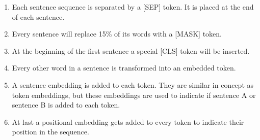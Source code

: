 \begin{enumerate}
    \item Each sentence sequence is separated by a [SEP] token. It is placed at the end of each sentence.
    \item Every sentence will replace 15\% of its words with a [MASK] token.
    \item At the beginning of the first sentence a special [CLS] token will be inserted.
    \item Every other word in a sentence is transformed into an embedded token.
    \item A sentence embedding is added to each token. They are similar in concept as token embeddings, but these embeddings are used to indicate if sentence A or sentence B is added to each token.
    \item At last a positional embedding gets added to every token to indicate their position in the sequence.
\end{enumerate}
